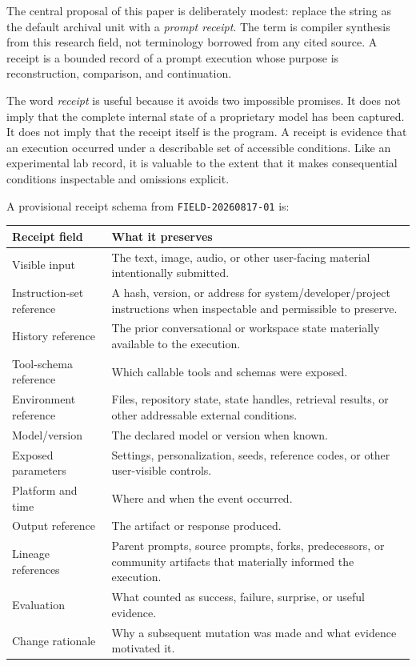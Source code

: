 \documentclass[11pt]{article}
\newcommand{\zettel}[1]{\texttt{#1}}
\begin{document}
The central proposal of this paper is deliberately modest: replace the string as the default archival unit with a \emph{prompt receipt}. The term is compiler synthesis from this research field, not terminology borrowed from any cited source. A receipt is a bounded record of a prompt execution whose purpose is reconstruction, comparison, and continuation.

The word \emph{receipt} is useful because it avoids two impossible promises. It does not imply that the complete internal state of a proprietary model has been captured. It does not imply that the receipt itself is the program. A receipt is evidence that an execution occurred under a describable set of accessible conditions. Like an experimental lab record, it is valuable to the extent that it makes consequential conditions inspectable and omissions explicit.

A provisional receipt schema from \zettel{FIELD-20260817-01} is:

\begin{longtable}{>{\raggedright\arraybackslash}p{} p{}}
\toprule
\textbf{Receipt field} & \textbf{What it preserves} \\
\midrule
Visible input & The text, image, audio, or other user-facing material intentionally submitted. \\
Instruction-set reference & A hash, version, or address for system/developer/project instructions when inspectable and permissible to preserve. \\
History reference & The prior conversational or workspace state materially available to the execution. \\
Tool-schema reference & Which callable tools and schemas were exposed. \\
Environment reference & Files, repository state, state handles, retrieval results, or other addressable external conditions. \\
Model/version & The declared model or version when known. \\
Exposed parameters & Settings, personalization, seeds, reference codes, or other user-visible controls. \\
Platform and time & Where and when the event occurred. \\
Output reference & The artifact or response produced. \\
Lineage references & Parent prompts, source prompts, forks, predecessors, or community artifacts that materially informed the execution. \\
Evaluation & What counted as success, failure, surprise, or useful evidence. \\
Change rationale & Why a subsequent mutation was made and what evidence motivated it. \\
\bottomrule
\end{longtable}
\end{document}

